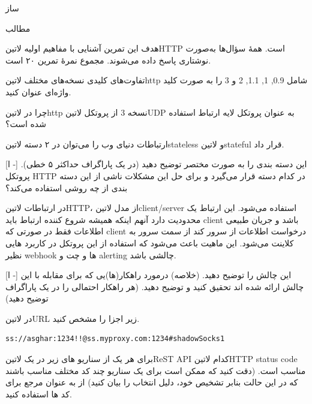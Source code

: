 \documentclass{../assignment}
\begin{document}
‌ساز

‌مطالب


هدف این تمرین آشنایی با مفاهیم اولیه ‌لاتین{HTTP} است. همهٔ سؤال‌ها به‌صورت نوشتاری پاسخ داده می‌شوند.
مجموع نمرهٔ تمرین ۲۰ است.



تفاوت‌های کلیدی نسخه‌های مختلف ‌لاتین{http} شامل 0.9, 1, 1.1, 2 و 3 را به صورت کلید واژه‌ای عنوان کنید.

چرا در ‌لاتین{http} نسخه 3 از پروتکل ‌لاتین{UDP} به عنوان پروتکل لایه ارتباط استفاده شده است؟


ارتباطات دنیای وب را می‌توان در ۲ دسته ‌لاتین{stateless} و ‌لاتین{stateful} قرار داد.

[ا -]
 این دسته بندی را به صورت مختصر توضیح دهید (در یک پاراگراف حداکثر ۵ خطی).
 پروتکل HTTP در کدام دسته قرار می‌گیرد و برای حل این مشکلات ناشی از این دسته بندی از چه روشی استفاده می‌کند؟


در ارتباطات ‌لاتین{HTTP}، از مدل ‌لاتین{client/server} استفاده می‌شود. این ارتباط یک محدودیت دارد آنهم اینکه همیشه شروع کننده ارتباط باید client باشد و جریان طبیعی اطلاعات فقط در صورتی که client درخواست اطلاعات از سرور کند از سمت سرور به کلاینت می‌شود. این ماهیت باعث می‌شود که استفاده از این پروتکل در کاربرد هایی نظیر webhook ها و چت و alerting چالشی باشد.

[ا -]
 این چالش را توضیح دهید. (خلاصه)
 درمورد راهکار(ها)یی که برای مقابله با این چالش ارائه شده اند تحقیق کنید و توضیح دهید. (هر راهکار احتمالی را در یک پاراگراف توضیح دهید)


در ‌لاتین{URL} زیر اجزا را مشخص کنید.

\begin{latin}
\begin{verbatim}
ss://asghar:1234!!@ss.myproxy.com:1234#shadowSocks1
\end{verbatim}
\end{latin}


برای هر یک از سناریو های زیر در یک ‌لاتین{ReST API} کدام ‌لاتین{HTTP status code} مناسب است.
(دقت کنید که ممکن است برای یک سناریو چند کد مختلف مناسب باشند که در این حالت بنابر تشخیص خود، دلیل انتخاب را بیان کنید)
از  به عنوان مرجع برای کد ها استفاده کنید.
\end{document}
